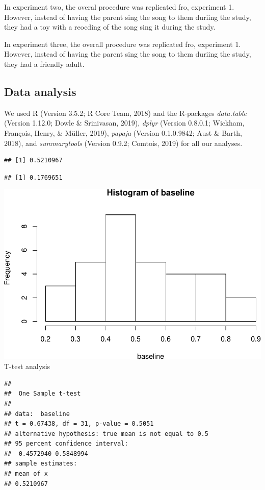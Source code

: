 \documentclass[man]{apa6}
\begin{document}
In experiment two, the overal procedure was replicated fro, experiment
1. However, instead of having the parent sing the song to them duriing
the study, they had a toy with a reocding of the song sing it during the
study.

In experiment three, the overall procedure was replicated fro,
experiment 1. However, instead of having the parent sing the song to
them duriing the study, they had a friendly adult.

\subsection{Data analysis}\label{data-analysis}

We used R (Version 3.5.2; R Core Team, 2018) and the R-packages
\emph{data.table} (Version 1.12.0; Dowle \& Srinivasan, 2019),
\emph{dplyr} (Version 0.8.0.1; Wickham, François, Henry, \& Müller,
2019), \emph{papaja} (Version 0.1.0.9842; Aust \& Barth, 2018), and
\emph{summarytools} (Version 0.9.2; Comtois, 2019) for all our analyses.

\begin{verbatim}
## [1] 0.5210967
\end{verbatim}

\begin{verbatim}
## [1] 0.1769651
\end{verbatim}

\includegraphics{Papa_files/figure-latex/unnamed-chunk-1-1.pdf} T-test
analysis

\begin{verbatim}
## 
##  One Sample t-test
## 
## data:  baseline
## t = 0.67438, df = 31, p-value = 0.5051
## alternative hypothesis: true mean is not equal to 0.5
## 95 percent confidence interval:
##  0.4572940 0.5848994
## sample estimates:
## mean of x 
## 0.5210967
\end{verbatim}
\end{document}
